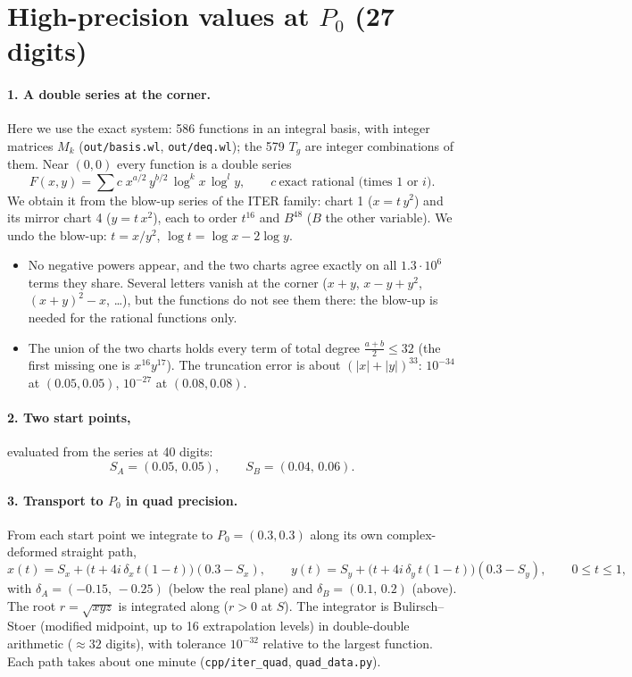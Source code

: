 \documentclass[11pt]{article}
\begin{document}
\section*{High-precision values at $P_0$ (27 digits)}

\paragraph{1. A double series at the corner.}
Here we use the exact system: 586 functions in an integral basis, with integer matrices $M_k$
(\texttt{out/basis.wl}, \texttt{out/deq.wl}); the 579 $T_g$ are integer combinations of them. Near $(0,0)$ every function is
a double series
\[
  F(x,y)=\sum c\;x^{a/2}\,y^{b/2}\,\log^k x\,\log^l y ,\qquad c\ \text{exact rational (times $1$ or $i$)}.
\]
We obtain it from the blow-up series of the ITER family: chart 1 ($x=t\,y^2$) and its mirror chart 4 ($y=t\,x^2$),
each to order $t^{16}$ and $B^{48}$ ($B$ the other variable). We undo the blow-up: $t=x/y^2$, $\log t=\log x-2\log y$.
\begin{itemize}
\item No negative powers appear, and the two charts agree exactly on all $1.3\cdot10^6$ terms they share. Several
  letters vanish at the corner ($x+y$, $x-y+y^2$, $(x+y)^2-x$, \dots), but the functions do not see them there: the
  blow-up is needed for the rational functions only.
\item The union of the two charts holds every term of total degree $\tfrac{a+b}2\le 32$ (the first missing one is
  $x^{16}y^{17}$). The truncation error is about $(|x|+|y|)^{33}$: $10^{-34}$ at $(0.05,0.05)$, $10^{-27}$ at
  $(0.08,0.08)$.
\end{itemize}

\paragraph{2. Two start points,} evaluated from the series at 40 digits:
\[
  S_A=(0.05,\,0.05),\qquad S_B=(0.04,\,0.06).
\]

\paragraph{3. Transport to $P_0$ in quad precision.}
From each start point we integrate to $P_0=(0.3,0.3)$ along its own complex-deformed straight path,
\[
  x(t)=S_x+\bigl(t+4i\,\delta_x\,t(1-t)\bigr)(0.3-S_x),\qquad
  y(t)=S_y+\bigl(t+4i\,\delta_y\,t(1-t)\bigr)(0.3-S_y),\qquad 0\le t\le1,
\]
with $\delta_A=(-0.15,\,-0.25)$ (below the real plane) and $\delta_B=(0.1,\,0.2)$ (above). The root
$r=\sqrt{xyz}$ is integrated along ($r>0$ at $S$). The integrator is Bulirsch--Stoer (modified midpoint, up to 16
extrapolation levels) in double-double arithmetic ($\approx32$ digits), with tolerance $10^{-32}$ relative to the largest
function. Each path takes about one minute (\texttt{cpp/iter\_quad}, \texttt{quad\_data.py}).
\end{document}
